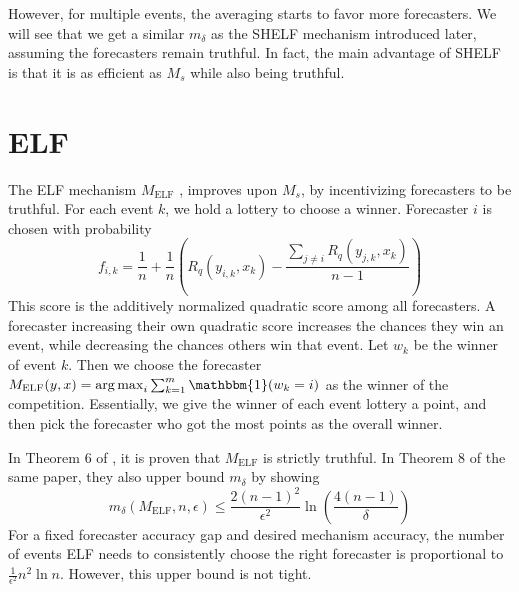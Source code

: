 \documentclass[letterpaper,12pt]{article}
\DeclareMathOperator*{\argmax}{arg\,max}
\newcommand{\1}{\mathbbm{1}}
\begin{document}
However, for multiple events, the averaging starts to favor more forecasters. We will see that we get a similar $m_\delta$ as the SHELF mechanism introduced later, assuming the forecasters remain truthful. In fact, the main advantage of SHELF is that it is as efficient as $M_s$ while also being truthful.

\section{ELF}
\newcommand{\elf}{M_{\mathrm{ELF}}}
The ELF mechanism $\elf$ \cite{elf}, improves upon $M_s$, by incentivizing forecasters to be truthful. For each event $k$, we hold a lottery to choose a winner. Forecaster $i$ is chosen with probability
\[ f_{i, k} = \frac{1}{n} + \frac{1}{n} \left(R_q(y_{i, k}, x_k) - \frac{\sum_{j\neq i} R_q(y_{j, k}, x_k)}{n-1} \right)\]
This score is the additively normalized quadratic score among all forecasters. A forecaster increasing their own quadratic score increases the chances they win an event, while decreasing the chances others win that event. Let $w_k$ be the winner of event $k$. Then we choose the forecaster $\elf(y, x) = \argmax_i \sum_{k=1}^m \1(w_k = i)$ as the winner of the competition. Essentially, we give the winner of each event lottery a point, and then pick the forecaster who got the most points as the overall winner.

In Theorem 6 of \cite{elf}, it is proven that $\elf$ is strictly truthful. In Theorem 8 of the same paper, they also upper bound $m_\delta$ by showing 
\[ m_\delta(\elf, n, \epsilon) \leq \frac{2(n-1)^2}{\epsilon^2} \ln \left(\frac{4(n-1)}{\delta}\right)\]
For a fixed forecaster accuracy gap and desired mechanism accuracy, the number of events ELF needs to consistently choose the right forecaster is proportional to $\frac{1}{\epsilon^2} n^2 \ln n$. However, this upper bound is not tight. 
\end{document}
